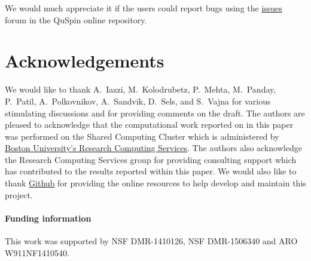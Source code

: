 \documentclass{SciPost}
\newcommand\0{\scalebox{-1}[1]{0}}
\begin{document}
We would much appreciate it if the users could report bugs using the \href{https://github.com/weinbe58/qspin/issues}{issues} forum in the QuSpin online repository.


\section*{Acknowledgements}
We would like to thank  A.~Iazzi, M.~Kolodrubetz, P.~Mehta, M.~Panday, P.~Patil, A.~Polkovnikov, A.~Sandvik, D.~Sels, and S.~Vajna for various stimulating discussions and for providing comments on the draft. The authors are pleased to acknowledge that the computational work reported on in this paper was performed on the Shared Computing Cluster which is administered by \href{http://www.bu.edu/tech/support/research/}{Boston University's Research Computing Services}. The authors also acknowledge the Research Computing Services group for providing consulting support which has contributed to the results reported within this paper. We would also like to thank \href{https://github.com/}{Github} for providing the online resources to help develop and maintain this project. 

\paragraph{Funding information}
This work was supported by NSF DMR-1410126, NSF DMR-1506340 and ARO W911NF1410540.
\end{document}
